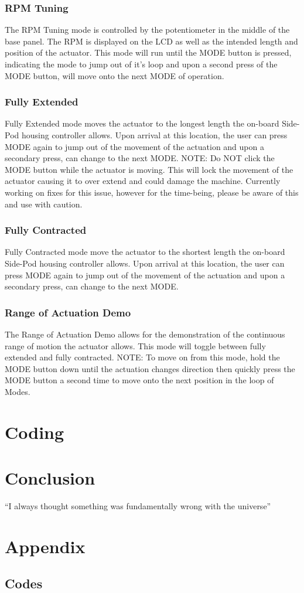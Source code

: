 \documentclass{article}
\begin{document}
\subsubsection{RPM Tuning}
The RPM Tuning mode is controlled by the potentiometer in the middle of the base panel. The RPM is displayed on the LCD as well as the intended length and position of the actuator. This mode will run until the MODE button is pressed, indicating the mode to jump out of it's loop and upon a second press of the MODE button, will move onto the next MODE of operation.
\subsubsection{Fully Extended}
Fully Extended mode moves the actuator to the longest length the on-board Side-Pod housing controller allows. Upon arrival at this location, the user can press MODE again to jump out of the movement of the actuation and upon a secondary press, can change to the next MODE.
\newline \newline
NOTE: Do NOT click the MODE button while the actuator is moving. This will lock the movement of the actuator causing it to over extend and could damage the machine. Currently working on fixes for this issue, however for the time-being, please be aware of this and use with caution.
\subsubsection{Fully Contracted}
Fully Contracted mode move the actuator to the shortest length the on-board Side-Pod housing controller allows. Upon arrival at this location, the user can press MODE again to jump out of the movement of the actuation and upon a secondary press, can change to the next MODE.
\subsubsection{Range of Actuation Demo}
The Range of Actuation Demo allows for the demonstration of the continuous range of motion the actuator allows. This mode will toggle between fully extended and fully contracted.
\newline \newline
NOTE: To move on from this mode, hold the MODE button down until the actuation changes direction then quickly press the MODE button a second time to move onto the next position in the loop of Modes.


\section{Coding}

\section{Conclusion}
``I always thought something was fundamentally wrong with the universe'' \citep{adams1995hitchhiker}

\section{Appendix}
\subsection{Codes}



\end{document}
